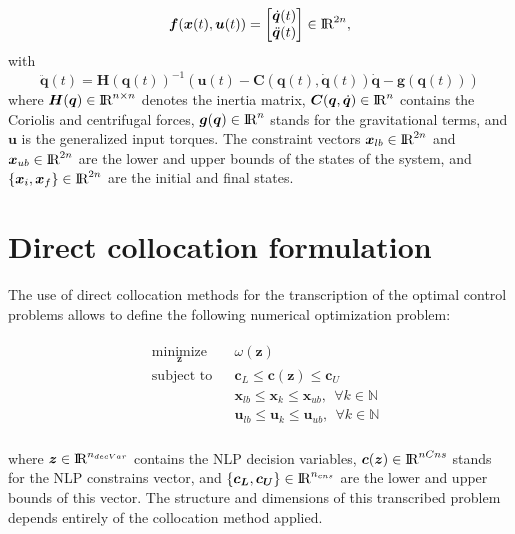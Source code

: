 \documentclass[12pt]{article}
\newcommand{\real}{\mbox{\rm I$\!$R}}
\begin{document}
%
\begin{equation}
\label{eq:dyn0}
\bm{f}(\bm{x}(t),\bm{u}(t))=
\begin{bmatrix}\dot{\bm{q}}(t)
\\ \ddot{\bm{q}}(t)
\end{bmatrix} \in \real^{2n}, 
\end{equation}
%
with
%
\begin{equation}\label{eq:dynamics}
\ddot{\bm{q}}(t)=\bm{H}(\bm{q}(t))^{-1}(\bm{u}(t)-\bm{C}(\bm{q}(t),\dot{\bm{q}}(t))\dot{\bm{q}}-\bm{g}(\bm{q}(t)))
\end{equation}
%
where $\bm{H}(\bm{q}) \in \real^{n \times n}$ denotes the inertia matrix, $\bm{C}(\bm{q},\dot{\bm{q}}) \in \real^{n}$ contains the Coriolis and centrifugal forces, $\bm{g}(\bm{q}) \in \real^{n} $ stands for the gravitational terms, and $\bm{u}$ is the generalized input torques. The constraint vectors $\bm{x}_{lb} \in \real^{2n} $ and $\bm{x}_{ub} \in \real^{2n}$ are the lower and upper bounds of the states of the system, and  $\{\bm{x}_{i},\bm{x}_{f}\} \in \real^{2n}$ are the initial and final states.\\

\section{Direct collocation formulation}

The use of direct collocation methods for the transcription of the optimal control problems allows to define the following numerical optimization problem:

\begin{eqnarray} \label{eq:discrete}
\begin{aligned}
&\underset{\bm{z} }{\text{minimize}}  
& &\omega(\bm{z})\\
& \text{subject to} & & \bm{c}_{L} \leq \bm{c}(\bm{z}) \leq \bm{c}_{U}\\ 
& & & \bm{x}_{lb}\leq \bm{x}_{k} \leq \bm{x}_{ub}, \ \ \forall k\in\mathbb{N} \\
& & & \bm{u}_{lb}\leq \bm{u}_{k} \leq \bm{u}_{ub}, \ \ \forall k\in\mathbb{N} \\
\end{aligned}
\end{eqnarray}


\noindent where $\bm{z} \in \real^{n_{decVar}}$ contains the NLP decision variables, $\bm{c}(\bm{z}) \in \real^{nCns}$ stands for the NLP constrains vector, and  $\{\bm{c_L},\bm{c_U}\} \in \real^{n_{cns}}$ are the lower and upper bounds of this vector. The structure and dimensions of this transcribed problem depends entirely of the collocation method applied.\\
\end{document}
